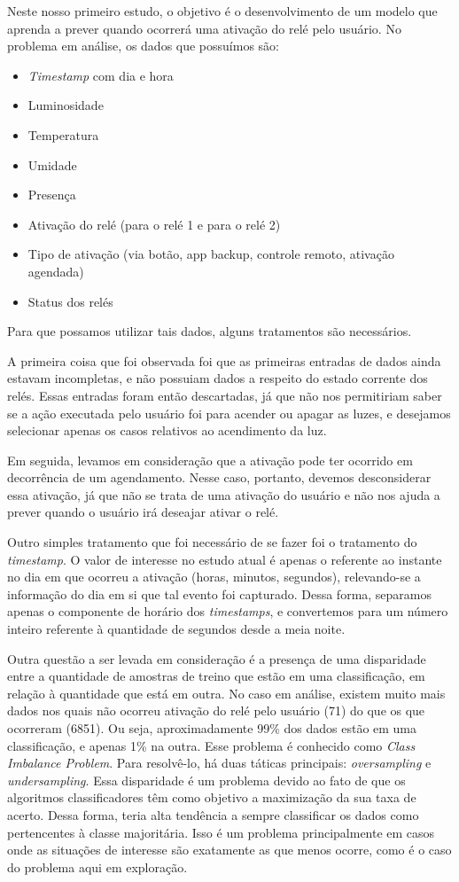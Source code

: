 			Neste nosso primeiro estudo, o objetivo é o desenvolvimento de um modelo que aprenda a prever quando ocorrerá uma ativação do relé pelo usuário. No problema em análise, os dados que possuímos são:

			\begin{itemize}
				\item \emph{Timestamp} com dia e hora
				\item Luminosidade
				\item Temperatura
				\item Umidade
				\item Presença
				\item Ativação do relé (para o relé 1 e para o relé 2)
				\item Tipo de ativação (via botão, app backup, controle remoto, ativação agendada)
				\item Status dos relés
			\end{itemize}

			Para que possamos utilizar tais dados, alguns tratamentos são necessários.

			A primeira coisa que foi observada foi que as primeiras entradas de dados ainda estavam incompletas, e não possuiam dados a respeito do estado corrente dos relés. Essas entradas foram então descartadas, já que não nos permitiriam saber se a ação executada pelo usuário foi para acender ou apagar as luzes, e desejamos selecionar apenas os casos relativos ao acendimento da luz.

			Em seguida, levamos em consideração que a ativação pode ter ocorrido em decorrência de um agendamento. Nesse caso, portanto, devemos desconsiderar essa ativação, já que não se trata de uma ativação do usuário e não nos ajuda a prever quando o usuário irá deseajar ativar o relé.

			Outro simples tratamento que foi necessário de se fazer foi o tratamento do \emph{timestamp}. O valor de interesse no estudo atual é apenas o referente ao instante no dia em que ocorreu a ativação (horas, minutos, segundos), relevando-se a informação do dia em si que tal evento foi capturado. Dessa forma, separamos apenas o componente de horário dos \emph{timestamps}, e convertemos para um número inteiro referente à quantidade de segundos desde a meia noite.

			Outra questão a ser levada em consideração é a presença de uma disparidade entre a quantidade de amostras de treino que estão em uma classificação, em relação à quantidade que está em outra. No caso em análise, existem muito mais dados nos quais não ocorreu ativação do relé pelo usuário (71) do que os que ocorreram (6851). Ou seja, aproximadamente 99\% dos dados estão em uma classificação, e apenas 1\% na outra. Esse problema é conhecido como \emph{Class Imbalance Problem}. Para resolvê-lo, há duas táticas principais: \emph{oversampling} e \emph{undersampling}. Essa disparidade é um problema devido ao fato de que os algoritmos classificadores têm como objetivo a maximização da sua taxa de acerto. Dessa forma, teria alta tendência a sempre classificar os dados como pertencentes à classe majoritária. Isso é um problema principalmente em casos onde as situações de interesse são exatamente as que menos ocorre, como é o caso do problema aqui em exploração.

